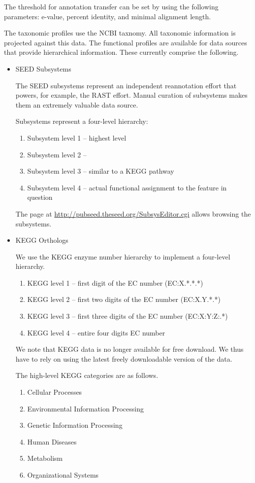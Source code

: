 \documentclass[12pt,fullpage]{report}
\begin{document}
The threshold for annotation transfer can be set by using the following parameters:
e-value,
percent identity, and
minimal alignment length.

The taxonomic profiles use the NCBI taxnomy. All taxonomic information is projected against this data.
The functional profiles are available for data sources that provide hierarchical information. These currently comprise the following.

\begin{itemize}
\item \gls{SEED} \gls{Subsystem}s

The SEED subsystems\cite{SUBSYSTEMS} represent an independent reannotation effort that powers, for example,  the RAST\cite{RAST} effort. Manual curation of subsystems makes them an extremely valuable data source.

Subsystems represent a four-level hierarchy:
\begin{enumerate}
\item Subsystem level 1 -- highest level
\item Subsystem level 2 -- 
\item Subsystem level 3 -- similar to a KEGG pathway
\item Subsystem level 4 -- actual functional assignment to the feature in question
\end{enumerate}

The page at \url{http://pubseed.theseed.org/SubsysEditor.cgi} allows browsing the subsystems.

\item KEGG Orthologs

We use the KEGG\cite{KEGG} enzyme number hierarchy to implement a four-level hierarchy.
\begin{enumerate}
\item KEGG level 1 -- first digit of the EC number (EC:X.*.*.*)
\item KEGG level 2 -- first two digits of the EC number (EC:X.Y.*.*)
\item KEGG level 3 -- first three digits of the EC number (EC:X:Y:Z:.*)
\item KEGG level 4 -- entire four digits EC number
\end{enumerate}

We note that KEGG data is no longer available for free download. We thus have to rely on using the latest freely downloadable version of the data.

The high-level KEGG categories are as follows.
\begin{enumerate}
\item Cellular Processes
\item Environmental Information Processing
\item Genetic Information Processing
\item Human Diseases
\item Metabolism
\item Organizational Systems
\end{enumerate}


\end{itemize}
\end{document}
